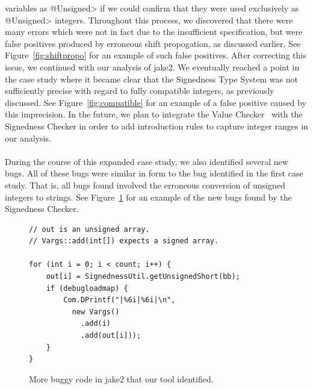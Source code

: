 variables as \<@Unsigned> if we could confirm that they were used exclusively
as \<@Unsigned> integers. Throughout this process, we discovered that there
were many errors which were not in fact due to the insufficient specification,
but were false positives produced by erroneous shift propogation, as discussed
earlier. See Figure~\ref{fig:shiftpropo} for an example of such false positives.
After correcting this issue, we continued with our analysis of jake2.
We eventually reached a point in the case study where it became clear that the
Signedness Type System was not sufficiently precise with regard to fully
compatible integers, as previously discussed. See Figure~\ref{fig:compatible} for
an example of a false positive caused by this imprecision.
In the future, we plan to integrate the
Value Checker~\cite{ValueChecker} with the Signedness Checker in order to
add introduction rules to capture integer ranges in our analysis.\\
\\
During the course of this expanded case study, we also identified several new
bugs. All of these bugs were similar in form to the bug identified in the first
case study. That is, all bugs found involved the erroneous conversion of
unsigned integers to strings. See Figure~\ref{fig:morebugs} for an example of
the new bugs found by the Signedness Checker.

\begin{figure}
\begin{lstlisting}
// out is an unsigned array.
// Vargs::add(int[]) expects a signed array.

for (int i = 0; i < count; i++) {
    out[i] = SignednessUtil.getUnsignedShort(bb);
    if (debugloadmap) {
        Com.DPrintf("|%6i|%6i|\n",
          new Vargs()
            .add(i)
            .add(out[i]));
    }
}
\end{lstlisting}
\caption{More buggy code in jake2 that our tool identified.}
\label{fig:morebugs}
\end{figure}

